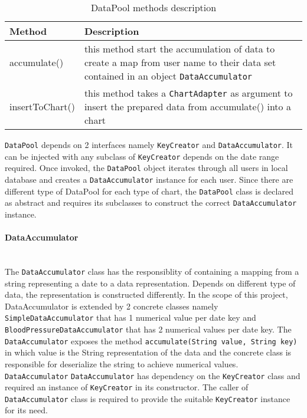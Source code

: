 \begin{table}
\begin{center}
    \begin{tabularx}{\textwidth}{| l | X |}
        \hline Method & Description \\
        \hline accumulate() & 
            this method start the accumulation of data to create a map from user name to their data set contained in an
            object \texttt{DataAccumulator} \\
        \hline insertToChart() &
            this method takes a \texttt{ChartAdapter} as argument to insert the prepared data from accumulate() into a
            chart \\
        \hline
    \end{tabularx}
\end{center}
\caption{DataPool methods description}
\end{table}
\noindent \texttt{DataPool} depends on 2 interfaces namely \texttt{KeyCreator} and \texttt{DataAccumulator}. It can be
injected with any subclass of \texttt{KeyCreator} depends on the date range required.  Once invoked, the
\texttt{DataPool} object iterates through all users in local database and creates a \texttt{DataAccumulator} instance
for each user. Since there are different type of DataPool for each type of chart, the \texttt{DataPool} class is
declared as abstract and requires its subclasses to construct the correct \texttt{DataAccumulator} instance. 

\paragraph{DataAccumulator}\mbox{} \\
The \texttt{DataAccumulator} class has the responsiblity of containing a mapping from a string representing a date to a
data representation. Depends on different type of data, the representation is constructed differently. In the scope of
this project, DataAccumulator is extended by 2 concrete classes namely \texttt{SimpleDataAccumulator} that has 1
numerical value per date key and \texttt{BloodPressureDataAccumulator} that has 2 numerical values per date key. The
\texttt{DataAccumulator} exposes the method \texttt{accumulate(String value, String key)} in which value is the String
representation of the data and the concrete class is responsible for deserialize the string to achieve numerical values.
\texttt{DataAccumulator}
\texttt{DataAccumulator} has dependency on the \texttt{KeyCreator} class and required an instance of \texttt{KeyCreator}
in its constructor. The caller of \texttt{DataAccumulator} class is required to provide the suitable \texttt{KeyCreator}
instance for its need.

